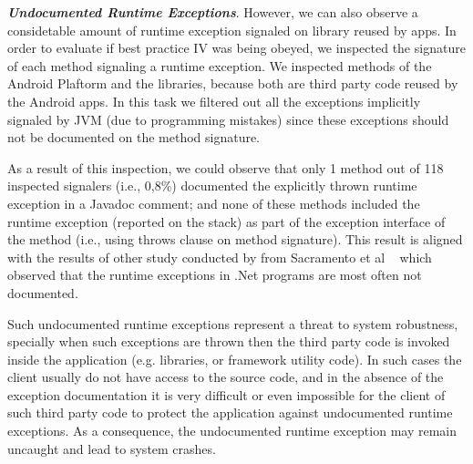 \documentclass[conference]{IEEEtran}
\begin{document}

\emph{\textbf{Undocumented Runtime Exceptions}}.
However, we can also observe a considetable amount of 
runtime exception signaled on library reused by apps.
In order to evaluate if  best practice IV was being obeyed, we inspected the   
signature of each method signaling a runtime exception. 
We inspected methods of the Android Plaftorm and 
the libraries, because both are  third  party code reused 
by the Android apps. In this task we filtered out all the exceptions implicitly 
signaled by  JVM (due to programming mistakes) 
since these exceptions should not be documented on the 
method signature. 

As a result of this inspection, we could observe that only 1 method out of 118 inspected signalers
 (i.e., 0,8\%) documented the explicitly thrown runtime exception in a Javadoc comment; and none of these methods
included the runtime exception  (reported on the stack) as part of the exception interface of the method (i.e., using 
throws clause on method signature). This result is aligned with the results of other study conducted by from 
Sacramento et al ~\cite{sacramento2006unchecked} which observed that the
runtime exceptions in .Net programs are most often not documented.

Such undocumented runtime exceptions represent a threat to system robustness, specially
when such exceptions are thrown then the third party code is invoked inside the application 
(e.g. libraries, or framework utility code). In such cases the client usually do not have access to 
the source code, and in the absence of
the exception documentation it is very difficult or even impossible for the client of such third party code to 
protect the application against undocumented runtime exceptions. As a consequence, the
 undocumented runtime exception may remain uncaught and lead to system crashes.
\end{document}
